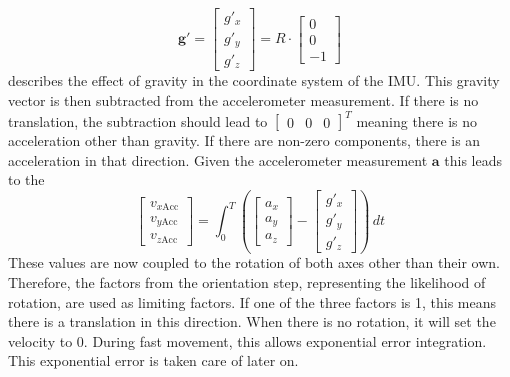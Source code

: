 \documentclass[letterpaper, 10 pt, conference]{ieeeconf}  %
\newcommand{\V}[1]{\mathbf{#1}} %
\begin{document}
\begin{equation}
\V g\V '=\begin{bmatrix}
g'_x\\
g'_y\\
g'_z
\end{bmatrix}
= R \cdot \begin{bmatrix}
0 \\0  \\ - 1
\end{bmatrix}
\end{equation}
describes the effect of gravity in the coordinate system of the IMU.
This gravity vector is then subtracted from the accelerometer measurement. If there is no translation, the subtraction should lead to $\begin{bmatrix}
0 & 0&0
\end{bmatrix}^T$ meaning there is no acceleration other than gravity. If there are non-zero components, there is an acceleration in that direction. Given the accelerometer measurement $\V a$ this leads to the 
\begin{equation}
\begin{bmatrix}
v_{x\text{Acc}} \\ v_{y\text{Acc}} \\v_{z\text{Acc}} 
\end{bmatrix}
= 
\int_0^T \left(\begin{bmatrix}
a_x \\ a_y \\ a_z
\end{bmatrix} 
-  \begin{bmatrix}
g'_x\\
g'_y\\
g'_z
\end{bmatrix} \right)\, dt
\end{equation}
These values are now coupled to the rotation of both axes other than their own.
Therefore, the factors from the orientation step, representing the likelihood of rotation, are used as limiting factors.
If one of the three factors is 1, this means there is a translation in this direction.
When there is no rotation, it will set the velocity to 0.
During fast movement, this allows exponential error integration. 
This exponential error is taken care of later on.
\end{document}
